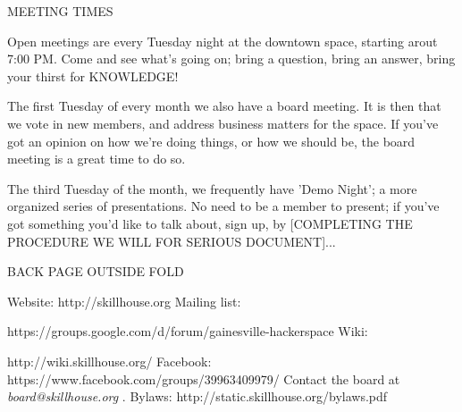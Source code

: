 \documentclass{leaflet}
\begin{document}
\newpage


MEETING TIMES

Open meetings are every Tuesday night at the downtown space, starting
arout 7:00 PM.  Come and see what's going on; bring a question, bring
an answer, bring your thirst for KNOWLEDGE!

The first Tuesday of every month we also have a board meeting.  It is
then that we vote in new members, and address business matters for the
space.  If you've got an opinion on how we're doing things, or how we
should be, the board meeting is a great time to do so.

The third Tuesday of the month, we frequently have 'Demo Night'; a
more organized series of presentations.  No need to be a member to
present; if you've got something you'd like to talk about, sign up, by
[COMPLETING THE PROCEDURE WE WILL FOR SERIOUS DOCUMENT]...




\newpage

BACK PAGE OUTSIDE FOLD

Website: http://skillhouse.org 
Mailing list: 

https://groups.google.com/d/forum/gainesville-hackerspace
Wiki: 

http://wiki.skillhouse.org/ 
Facebook:  https://www.facebook.com/groups/39963409979/
Contact the board at \textit{ board@skillhouse.org }. 
Bylaws: http://static.skillhouse.org/bylaws.pdf
\end{document}
